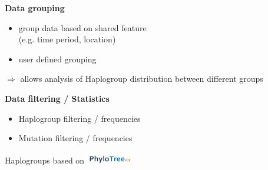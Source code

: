 \documentclass[a0paper,portrait]{baposter}
\begin{document}
\begin{poster}
{	\begin{minipage}[t]{0.5\textwidth}
		\textbf{Data grouping}
		\begin{itemize}[leftmargin=*]
			\item group data based on shared feature \\
			(e.g. time period, location)
			\item user defined grouping
		\end{itemize}
		$\Rightarrow$ allows analysis of Haplogroup distribution between different groups
	\end{minipage}
	\hspace{0.5em}
	\begin{minipage}[t]{0.5\textwidth}
		\textbf{Data filtering / Statistics}
		\begin{itemize}[leftmargin=*]
			\item Haplogroup filtering / frequencies
			\item Mutation filtering / frequencies
		\end{itemize}
		Haplogroups based on \includegraphics[width=2cm]{figures/phylotree.png}
	\end{minipage}

	\vspace{1em}

}
\end{poster}
\end{document}
